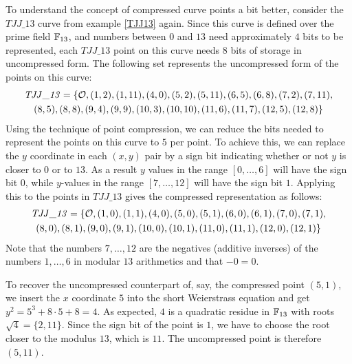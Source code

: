 \begin{example} To understand the concept of compressed curve points a bit better, consider the $\mathit{TJJ\_13}$ curve from example \ref{TJJ13} again. Since this curve is defined over the prime field $\mathbb{F}_{13}$, and numbers between $0$ and $13$ need approximately $4$ bits to be represented, each $\mathit{TJJ\_13}$ point on this curve needs $8$ bits of storage in uncompressed form. The following set represents the uncompressed form of the points on this curve:
\begin{multline*}
\mathit{TJJ\_13} = \{\mathcal{O}, (1, 2), (1, 11), (4, 0), (5, 2), (5, 11), (6, 5), (6, 8), (7,2), (7, 11), \\ (8, 5), (8, 8), (9, 4), (9, 9), (10, 3), (10,
10), (11, 6), (11, 7), (12, 5), (12, 8)\}
\end{multline*}
Using the technique of point compression, we can reduce the bits needed to represent the points on this curve to  $5$ per point. To achieve this, we can replace the $y$ coordinate in each $(x,y)$ pair by a sign bit indicating whether or not $y$ is closer to $0$ or to $13$. As a result $y$ values in the range $[0,\ldots,6]$ will have the sign bit $0$, while $y$-values in the range $[7,\ldots,12]$ will have the sign bit $1$. Applying this to the points in $\mathit{TJJ\_13}$ gives the compressed representation as follows:
\begin{multline*}
\mathit{TJJ\_13} = \{\mathcal{O}, (1, 0), (1, 1), (4, 0), (5, 0), (5, 1), (6, 0), (6, 1), (7,0), (7, 1), \\ (8, 0), (8, 1), (9, 0), (9, 1), (10, 0), (10,1), (11, 0), (11, 1), (12, 0), (12, 1)\}
\end{multline*} 
Note that the numbers $7,\ldots, 12$ are the negatives (additive inverses) of the numbers $1,\ldots, 6$ in modular $13$ arithmetics and that $-0=0$.

To recover the uncompressed counterpart of, say, the compressed point $(5,1)$, we insert the $x$ coordinate $5$ into the short Weierstrass equation and get $y^2 = 5^3 + 8\cdot 5 +8 = 4$. As expected, $4$ is a quadratic residue in $\mathbb{F}_{13}$ with roots $\sqrt{4}= \{2,11\}$. Since the sign bit of the point is $1$, we have to choose the root closer to the modulus $13$, which is $11$. The uncompressed point is therefore $(5,11)$. 
\end{example}
